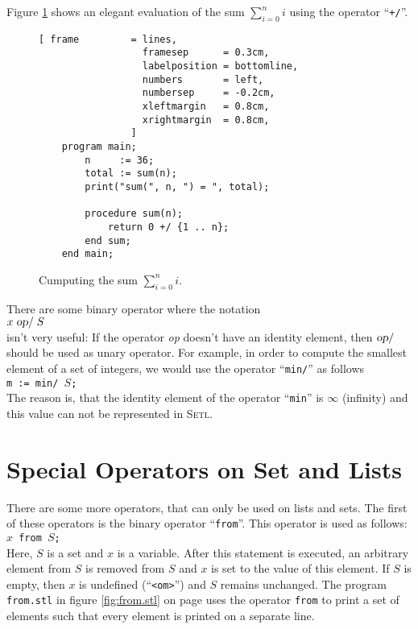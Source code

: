 Figure \ref{fig:sum-slim.stl} shows an elegant evaluation of the sum $\sum\limits_{i=0}^{n} i$
using the operator ``\texttt{+/}''.

\begin{figure}[!ht]
\centering
\begin{Verbatim}[ frame         = lines, 
                  framesep      = 0.3cm, 
                  labelposition = bottomline,
                  numbers       = left,
                  numbersep     = -0.2cm,
                  xleftmargin   = 0.8cm,
                  xrightmargin  = 0.8cm,
                ]
    program main;
        n     := 36;
        total := sum(n);
        print("sum(", n, ") = ", total);

        procedure sum(n);
            return 0 +/ {1 .. n};
        end sum;
    end main;
\end{Verbatim}
\vspace*{-0.3cm}
\caption{Cumputing the sum $\sum\limits_{i=0}^{n} i$.}
\label{fig:sum-slim.stl}
\end{figure}

There are some binary operator where the notation
\\[0.2cm]
\hspace*{1.3cm} $x \;\textsl{op}\mathtt{/}\; S$ 
\\[0.2cm]
isn't very useful:  If the operator \textsl{op} doesn't have an identity element,
then $\textsl{op}\mathtt{/}$ should be used as unary operator.  For example, in order to
compute the smallest element of a set of integers, we would use the operator
``\texttt{min/}'' as follows \\[0.2cm]
\hspace*{1.3cm} 
\texttt{m := min/ $S$;} 
\\[0.2cm]
The reason is, that the identity element of the operator ``\texttt{min}'' is $\infty$ (infinity)
and this value can not be represented in \textsc{Setl}.


\section{Special Operators on Set and Lists}
There are some more operators, that can only be used on lists and sets.
The first of these operators is the binary  operator
``\texttt{from}''.  This operator is used as follows: 
\\[0.2cm]
\hspace*{1.3cm} \texttt{$x$ from $S$;}
\\[0.2cm]
Here,  $S$ is a set and $x$ is a variable.  After this statement is executed,
an arbitrary element from $S$ is removed from $S$ and $x$ is set to the value of this element.
If  $S$ is empty, then  $x$ is undefined (``\texttt{<om>}'') and 
$S$ remains unchanged.  The program \texttt{from.stl} in figure  \ref{fig:from.stl} 
on page \pageref{fig:from.stl} uses the operator \texttt{from} to print a set of elements
such that every element is printed on a separate line.

